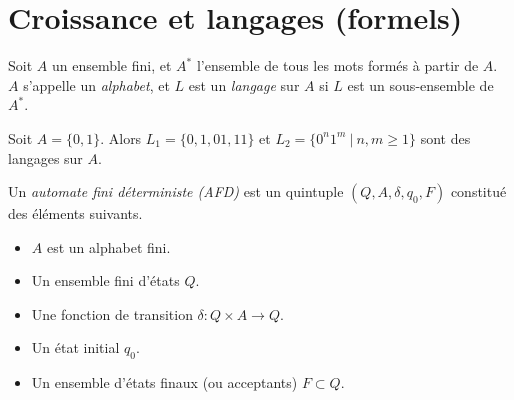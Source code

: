 
\chapter{Croissance et langages (formels)}
\label{cha:croiss-et-lang-form}

  \begin{defi}
    Soit $A$ un ensemble fini, et $A^\ast$ l'ensemble de tous les mots formés à partir de $A$. $A$ s'appelle
    un \emph{alphabet},  et $L$ est un \emph{langage}  sur $A$ si $L$ est un
    sous-ensemble de $A^\ast$.
  \end{defi}

  \begin{ex}
    Soit $A = \{0, 1\}$. Alors $L_1 = \{0, 1, 01, 11\}$ et $L_2 = \{0^n1^m\ |\ n, m \geq 1\}$ sont des
    langages sur $A$.
  \end{ex}


  \begin{defi}
    Un \emph{automate fini déterministe (AFD)}  est un quintuple $(Q, A,
    \delta, q_0, F)$ constitué des éléments suivants.
    \begin{itemize}
    \item $A$ est un alphabet fini.
    \item Un ensemble fini d'états $Q$.
    \item Une fonction de transition $\delta: Q \times A \to Q$.
    \item Un état initial $q_0$.
    \item Un ensemble d'états finaux (ou acceptants) $F \subset Q$.
    \end{itemize}
  \end{defi}

